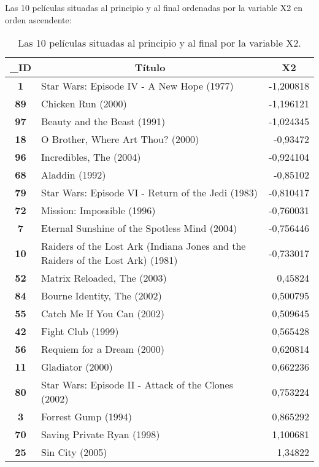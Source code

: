 \documentclass{uimppracticas}
\begin{document}
Las 10 películas situadas al principio y al final ordenadas por la variable X2 en orden ascendente:

\begin{table}[h]
	\centering
	\begin{tabular}{|c|l|r|}
		\hline
		\textbf{\_ID} & \multicolumn{1}{c|}{\textbf{Título}}                                             & \multicolumn{1}{c|}{\textbf{X2}} \\ \hline
		\textbf{1}  & Star Wars: Episode IV - A New Hope (1977)    & -1,200818 \\ \hline
		\textbf{89} & Chicken Run (2000)                           & -1,196121 \\ \hline
		\textbf{97} & Beauty and the Beast (1991)                  & -1,024345 \\ \hline
		\textbf{18} & O Brother, Where Art Thou? (2000)            & -0,93472  \\ \hline
		\textbf{96} & Incredibles, The (2004)                      & -0,924104 \\ \hline
		\textbf{68} & Aladdin (1992)                               & -0,85102  \\ \hline
		\textbf{79}   & Star Wars: Episode VI - Return of the Jedi (1983)                                & -0,810417                        \\ \hline
		\textbf{72} & Mission: Impossible (1996)                   & -0,760031 \\ \hline
		\textbf{7}  & Eternal Sunshine of the Spotless Mind (2004) & -0,756446 \\ \hline
		\textbf{10}   & Raiders of the Lost Ark (Indiana Jones and the Raiders of the Lost Ark)   (1981) & -0,733017                        \\ \hline
		\hline
		\textbf{52} & Matrix Reloaded, The (2003) & 0,45824  \\ \hline
		\textbf{84} & Bourne Identity, The (2002) & 0,500795 \\ \hline
		\textbf{55} & Catch Me If You Can (2002)  & 0,509645 \\ \hline
		\textbf{42} & Fight Club (1999)           & 0,565428 \\ \hline
		\textbf{56} & Requiem for a Dream (2000)  & 0,620814 \\ \hline
		\textbf{11} & Gladiator (2000)            & 0,662236 \\ \hline
		\textbf{80}   & Star Wars: Episode II - Attack of the Clones (2002) & 0,753224                         \\ \hline
		\textbf{3}  & Forrest Gump (1994)         & 0,865292 \\ \hline
		\textbf{70} & Saving Private Ryan (1998)  & 1,100681 \\ \hline
		\textbf{25} & Sin City (2005)             & 1,34822  \\ \hline
	\end{tabular}
	\caption{Las 10 películas situadas al principio y al final por la variable X2.}
	\label{X2_principio}
\end{table}
\end{document}
